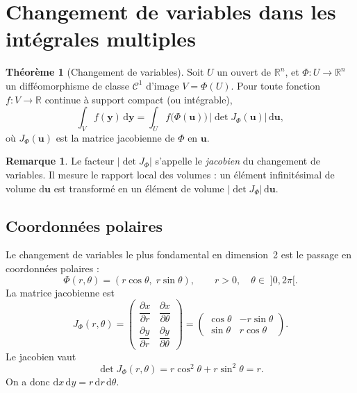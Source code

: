 \documentclass[12pt,a4paper,openany]{book}
\theoremstyle{definition}
\newtheorem{theoreme}{Théorème}[chapter]
\newtheorem{remarque}{Remarque}[chapter]
\newcommand{\R}{\mathbb{R}}
\newcommand{\abs}[1]{\left\lvert #1 \right\rvert}
\newcommand{\dd}{\mathrm{d}}
\begin{document}
\section{Changement de variables dans les intégrales multiples}
\label{sec:changement-variables}


\begin{theoreme}[Changement de variables]
  \label{thm:changement-variables}
  Soit $U$ un ouvert de $\R^n$, et $\Phi\colon U \to \R^n$ un
  difféomorphisme de classe $\mathcal{C}^1$ d'image $V = \Phi(U)$. Pour
  toute fonction $f\colon V \to \R$ continue à support compact (ou
  intégrable),
  \begin{equation}\label{eq:changement-variables}
    \int_V f(\mathbf{y})\,\dd\mathbf{y}
    = \int_U f\bigl(\Phi(\mathbf{u})\bigr)\,
    \abs{\det J_\Phi(\mathbf{u})}\,\dd\mathbf{u},
  \end{equation}
  où $J_\Phi(\mathbf{u})$ est la matrice jacobienne de $\Phi$ en
  $\mathbf{u}$.
\end{theoreme}

\begin{remarque}
  Le facteur $\abs{\det J_\Phi}$ s'appelle le \emph{jacobien}
  du changement de variables. Il mesure le rapport local des volumes :
  un élément infinitésimal de volume $\dd\mathbf{u}$ est transformé en
  un élément de volume $\abs{\det J_\Phi}\,\dd\mathbf{u}$.
\end{remarque}


\subsection{Coordonnées polaires}
\label{subsec:coord-polaires}


Le changement de variables le plus fondamental en dimension~2 est le
passage en coordonnées polaires :
\[
  \Phi(r,\theta) = (r\cos\theta,\; r\sin\theta),
  \qquad r > 0,\quad \theta \in\; ]0, 2\pi[.
\]
La matrice jacobienne est
\[
  J_\Phi(r,\theta) = \begin{pmatrix}
    \dfrac{\partial x}{\partial r} & \dfrac{\partial x}{\partial \theta} \\[8pt]
    \dfrac{\partial y}{\partial r} & \dfrac{\partial y}{\partial \theta}
  \end{pmatrix}
  = \begin{pmatrix}
    \cos\theta & -r\sin\theta \\
    \sin\theta & r\cos\theta
  \end{pmatrix}.
\]
Le jacobien vaut
\begin{equation}\label{eq:jacobien-polaire}
  \det J_\Phi(r,\theta) = r\cos^2\theta + r\sin^2\theta = r.
\end{equation}
On a donc $\dd x\,\dd y = r\,\dd r\,\dd\theta$.
\end{document}
